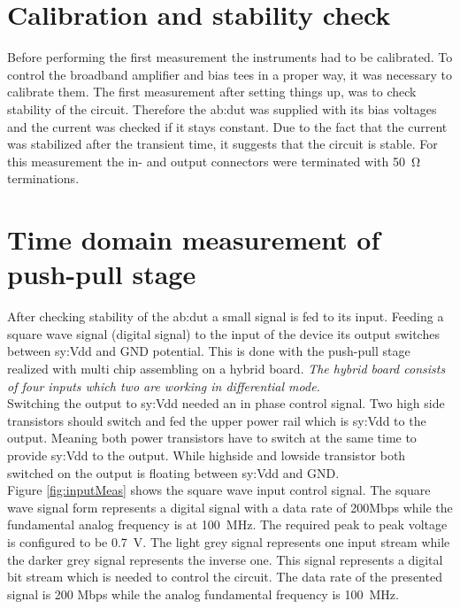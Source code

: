 \section{Calibration and stability check}
Before performing the first measurement the instruments had to be calibrated.
To control the broadband amplifier and bias tees in a proper way, it was necessary to calibrate them.
The first measurement after setting things up, was to check stability of the circuit.
Therefore the \gls{ab:dut} was supplied with its bias voltages and the current was checked if it stays constant.
Due to the fact that the current was stabilized after the transient time, it suggests that the circuit is stable.
For this measurement the in- and output connectors were terminated with \SI{50}{\ohm} terminations.


\section{Time domain measurement of push-pull stage}
After checking stability of the \gls{ab:dut} a small signal is fed to its input.
Feeding a square wave signal (digital signal) to the input of the device its output switches between \gls{sy:Vdd} and GND potential.
This is done with the push-pull stage realized with multi chip assembling on a hybrid board.
\textit{The hybrid board consists of four inputs which two are working in differential mode.}\\
Switching the output to \gls{sy:Vdd} needed an in phase control signal.
Two high side transistors should switch and fed the upper power rail which is \gls{sy:Vdd} to the output.
Meaning both power transistors have to switch at the same time to provide \gls{sy:Vdd} to the output.
While highside and lowside transistor both switched on the output is floating between \gls{sy:Vdd} and GND.\\
Figure \ref{fig:inputMeas} shows the square wave input control signal.
The square wave signal form represents a digital signal with a data rate of 200Mbps while the fundamental analog frequency is at \SI{100}{\mega \hertz}.
The required peak to peak voltage is configured to be \SI{0.7}{\volt}.
The light grey signal represents one input stream while the darker grey signal represents the inverse one.
This signal represents a digital bit stream which is needed to control the circuit.
The data rate of the presented signal is 200 Mbps while the analog fundamental frequency is \SI{100}{\mega\hertz}.


